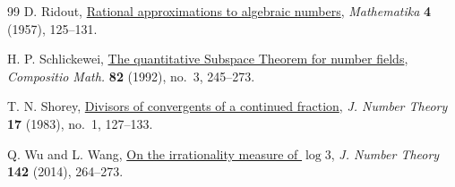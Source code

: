 \documentclass[11pt,reqno]{amsart}
\theoremstyle{definition}
\theoremstyle{plain}
\theoremstyle{definition}
\theoremstyle{remark}
\begin{document}
\begin{thebibliography}{99}
D. Ridout,
\href{https://www.cambridge.org/core/journals/mathematika/article/rational-approximations-to-algebraic-numbers/9B22B10EFDE4FFC405FCAAFB12C67D3C}{Rational approximations to algebraic numbers},
\emph{Mathematika} \textbf{4} (1957), 125--131.

H. P. Schlickewei,
\href{https://www.numdam.org/item/CM_1992__82_3_245_0/}{The quantitative Subspace Theorem for number fields},
\emph{Compositio Math.} \textbf{82} (1992), no.~3, 245--273.

T. N. Shorey,
\href{https://doi.org/10.1016/0022-314X(83)90014-8}{Divisors of convergents of a continued fraction},
\emph{J. Number Theory} \textbf{17} (1983), no.~1, 127--133.

Q. Wu and L. Wang,
\href{https://doi.org/10.1016/j.jnt.2014.03.007}{On the irrationality measure of $\log3$},
\emph{J. Number Theory} \textbf{142} (2014), 264--273.
\end{thebibliography}
\end{document}
